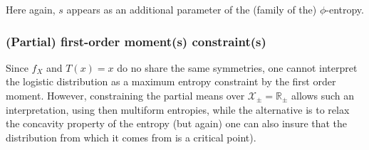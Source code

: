 \documentclass[entropy,article,submit,moreauthors,pdftex]{Definitions/mdpi}
\newcommand{\SZ}[1]{{\color{blue} #1}}                                       %
\def\Rset{\mathbb{R}}%
\def\X{\mathcal{X}}%
\begin{document}
\SZ{Here again, $s$ appears as an  additional parameter of the (family of the)
  $\phi$-entropy.}




\subsubsection{(Partial) first-order moment(s) constraint(s)}
\label{subsubsecapp:LogisticFirstPartial}

Since $f_X$ and $T(x) = x$ do no share the same symmetries, one cannot interpret
the logistic  distribution as a  maximum entropy  constraint by the  first order
moment. However, constraining the partial means over $\X_\pm = \Rset_\pm$ allows
such an interpretation, using then multiform entropies, while the alternative is
to relax  the concavity  property of  the entropy \SZ{(but  again) one  can also
  insure that the  distribution from which it comes from  is a critical point)}.
\end{document}
